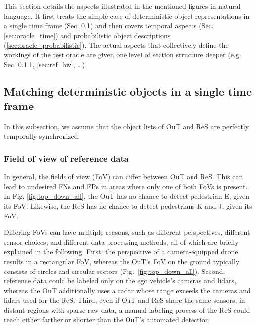 \documentclass[conference]{IEEEtran}
\begin{document}
This section details the aspects illustrated in the mentioned figures in natural language. 
It first treats the simple case of deterministic object representations in a single time frame (Sec. \ref{sec:oracle_simple}) and then covers temporal aspects (Sec. \ref{sec:oracle_time}) and probabilistic object descriptions (\ref{sec:oracle_probabilistic}).
The actual aspects that collectively define the workings of the test oracle are given one level of section structure deeper (e.g. Sec. \ref{sec:fov_ref}, \ref{sec:ref_hw}, \dots). 



\subsection{Matching deterministic objects in a single time frame}
\label{sec:oracle_simple}

In this subsection, we assume that the object lists of OuT and ReS are perfectly temporally synchronized. 

\subsubsection{Field of view of reference data}
\label{sec:fov_ref}
In general, the fields of view (FoV) can differ between OuT and ReS. This can lead to undesired FNs and FPs in areas where only one of both FoVs is present. 
In Fig. \ref{fig:top_down_all}, the OuT has no chance to detect pedestrian E, given its FoV. 
Likewise, the ReS has no chance to detect pedestrians K and J, given its FoV. 

Differing FoVs can have multiple reasons, such as different perspectives, different sensor choices, and different data processing methods, all of which are briefly explained in the following.
First, the perspective of a camera-equipped drone results in a rectangular FoV, whereas the OuT's FoV on the ground typically consists of circles and circular sectors (Fig.~\ref{fig:top_down_all}).
Second, reference data could be labeled only on the ego vehicle's cameras and lidars, whereas the OuT additionally uses a radar whose range exceeds the cameras and lidars used for the ReS. 
Third, even if OuT and ReS share the same sensors, in distant regions with sparse raw data, a manual labeling process of the ReS could reach either farther or shorter than the OuT's automated detection.
\end{document}
